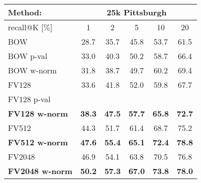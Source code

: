 
	\begin{tabularx}{0.864\linewidth}{|l|c c c c c|}
		\hline 
		\rowcolor{maroon!50}
		Method: & \multicolumn{5}{c|}{25k Pittsburgh} \\
		\hline 
		\hline 
		\rowcolor{maroon!50}
		recall@K [$\%$] & 1 & 2 & 5 & 10 & 20 \\
		\hline
		\rowcolor{maroon!10}
		BOW           & 28.7  & 35.7  & 45.8 & 53.7   & 61.5 \\
        \rowcolor{maroon!10}
		BOW p-val     & 33.0  & 40.3  & 50.2 & 58.7   &  66.4 \\
        \rowcolor{maroon!10}
		BOW w-norm  & 31.8  & 38.7  & 49.7 & 60.2   & 69.4 \\
        \hline
		\rowcolor{maroon!10}
		FV128         & 33.6  & 41.8  & 52.0 & 59.8   & 67.7  \\
		\rowcolor{maroon!10}
		FV128 p-val                 & \textbf{}       & \textbf{}     & \textbf{}     & \textbf{}     & \textbf{}  \\
    \rowcolor{maroon!10}
		\textbf{FV128 w-norm}     & \textbf{38.3}   & \textbf{47.5} & \textbf{57.7} & \textbf{65.8} & \textbf{72.7}  \\
    \hline  
    \rowcolor{maroon!10}
    FV512         & 44.3 & 51.7   & 61.4  & 68.7   & 75.2  \\
    \rowcolor{maroon!10}
    \textbf{FV512 w-norm}   & \textbf{47.6}  & \textbf{55.4} & \textbf{65.1} & \textbf{72.4} & \textbf{78.8}  \\
    \hline
		\rowcolor{maroon!10}
		FV2048        & 46.9  & 54.1  & 63.8  & 70.5    & 76.8 \\
		\rowcolor{maroon!10}
        \rowcolor{maroon!10}
        \textbf{FV2048 w-norm}  & \textbf{50.2} & \textbf{57.3} & \textbf{67.0} & \textbf{73.8} & \textbf{78.0} \\
        \hline
\end{tabularx}

